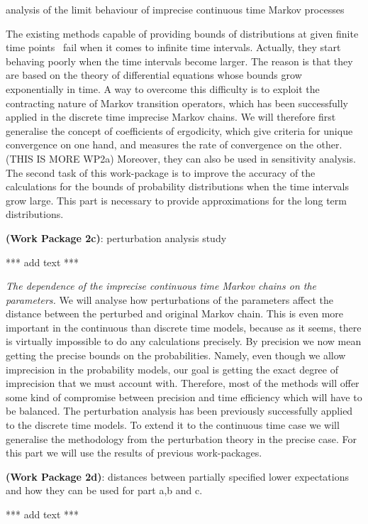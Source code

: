 \documentclass[11pt,dvipsnames,usenames,a4paper]{article}
\begin{document}
analysis of the limit behaviour of imprecise continuous time Markov processes

The existing methods capable of providing bounds of distributions at given finite time points~\cite{Skulj2015} fail when it comes to infinite time intervals. Actually, they start behaving poorly when the time intervals become larger. The reason is that they are based on the theory of differential equations whose bounds grow exponentially in time. A way to overcome this difficulty is to exploit the contracting nature of Markov transition operators, which has been successfully applied in the discrete time imprecise Markov chains. We will therefore first generalise the concept of coefficients of ergodicity, which give criteria for unique convergence on one hand, and measures the rate of convergence on the other. (THIS IS MORE WP2a) Moreover, they can also be used in sensitivity analysis. The second task of this work-package is to improve the accuracy of the calculations for the bounds of probability distributions when the time intervals grow large. This part is necessary to provide approximations for the long term distributions.


{\bf (Work Package 2c)}: perturbation analysis study

*** add text ***

\emph{The dependence of the imprecise continuous time Markov chains on the parameters.} We will analyse how perturbations of the parameters affect the distance between the perturbed and original Markov chain. This is even more important in the continuous than discrete time models, because as it seems, there is virtually impossible to do any calculations precisely. By precision we now mean getting the precise bounds on the probabilities. Namely, even though we allow imprecision in the probability models, our goal is getting the exact degree of imprecision that we must account with. Therefore, most of the methods will offer some kind of compromise between precision and time efficiency which will have to be balanced. The perturbation analysis has been previously successfully applied to the discrete time models. To extend it to the continuous time case we will generalise the methodology from the perturbation theory in the precise case. For this part we will use the results of previous work-packages. 

{\bf (Work Package 2d)}: distances between partially specified lower expectations and how they can be used for part a,b and c.

*** add text ***
\end{document}
